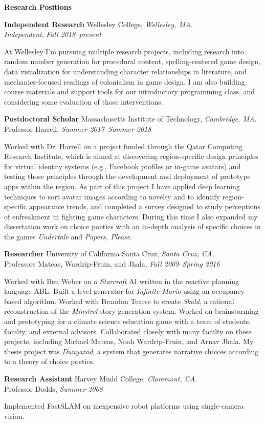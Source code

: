 \documentclass[11pt]{article}
\newenvironment{sct}[1]{%
  \vspace{8pt plus 2pt minus 4pt}\textbf{\Large #1} \hrulefill\vspace{6pt}
  \begin{adjustwidth}{6pt}{0pt}
}{%
  \end{adjustwidth}
}
\newcommand{\work}[1]{\textit{#1}\xspace}
\newcommand{\indented}[1]{\hspace*{\fill}\parbox{\textwidth-22pt}{#1}}
\newcommand{\experience}[6]{%
  \textbf{#1} #2, \textit{#3.} \\
  #4, \textit{#5} \\
  \indented{#6}
  \vspace{7pt plus 2pt minus 2pt}
}
\begin{document}
\begin{sct}{Research Positions}

\experience{Independent Research}{Wellesley College}{Wellesley, MA}%
{\emph{Independent}}{Fall 2018--present}{
  At Wellesley I'm pursuing multiple research projects, including
  research into random number generation for procedural content,
  spelling-centered game design, data visualization for understanding
  character relationships in literature, and mechanics-focused readings
  of colonialism in game design. I am also building course materials and
  support tools for our introductory programming class, and considering
  some evaluation of those interventions.
}

\experience{Postdoctoral Scholar}{Massachusetts Institute of Technology}{Cambridge, MA}%
{Professor Harrell}{Summer 2017--Summer 2018}{
  Worked with Dr. Harrell on a project funded through the Qatar
  Computing Research Institute, which is aimed at discovering
  region-specific design principles for virtual identity systems (e.g.,
  Facebook profiles or in-game avatars) and testing those principles
  through the development and deployment of prototype apps within the
  region. As part of this project I have applied deep learning
  techniques to sort avatar images according to novelty and to identify
  region-specific appearance trends, and completed a survey designed to
  study perceptions of enfreakment in fighting game characters. During
  this time I also expanded my dissertation work on choice poetics with
  an in-depth analysis of specific choices in the games \work{Undertale}
  and \work{Papers, Please}.
}

\experience{Researcher}{University of California Santa Cruz}{Santa Cruz, CA}%
{Professors Mateas, Wardrip-Fruin, and Jhala}{Fall 2009--Spring 2016}{
  Worked with Ben Weber on a \work{Starcraft} AI written in the reactive
  planning language ABL. Built a level generator for \work{Infinite
  Mario} using an occupancy-based algorithm. Worked with Brandon Tearse
  to create \work{Skald}, a rational reconstruction of the
  \work{Minstrel} story generation system. Worked on brainstorming and
  prototyping for a climate science education game with a team of
  students, faculty, and external advisors. Collaborated closely with
  many faculty on these projects, including Michael Mateas, Noah
  Wardrip-Fruin, and Arnav Jhala. My thesis project was \work{Dunyazad},
  a system that generates narrative choices according to a theory of
  choice poetics.
}

\experience{Research Assistant}{Harvey Mudd College}{Claremont, CA}%
{Professor Dodds}{Summer 2008}{
  Implemented FastSLAM on inexpensive robot platforms using
  single-camera vision.
}


\end{sct}
\end{document}
